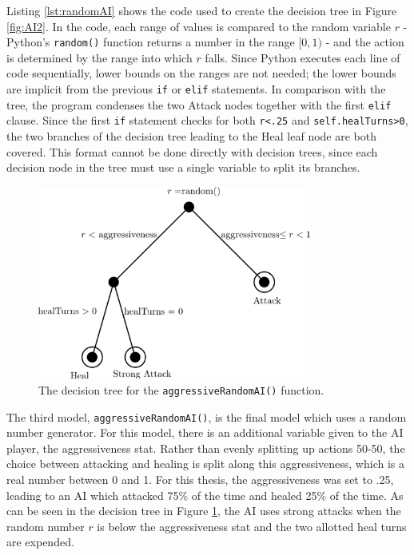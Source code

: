 Listing \ref{lst:randomAI} shows the code used to create the decision tree in Figure \ref{fig:AI2}. In the code, each range of values is compared to the random variable $r$ - Python's \texttt{random()} function returns a number in the range $[0, 1)$ - and the action is determined by the range into which $r$ falls. Since Python executes each line of code sequentially, lower bounds on the ranges are not needed; the lower bounds are implicit from the previous \texttt{if} or \texttt{elif} statements. In comparison with the tree, the program condenses the two Attack nodes together with the first \texttt{elif} clause. Since the first \texttt{if} statement checks for both \texttt{r<.25} and \texttt{self.healTurns>0}, the two branches of the decision tree leading to the Heal leaf node are both covered. This format cannot be done directly with decision trees, since each decision node in the tree must use a single variable to split its branches.

\begin{figure}[H]
  \centering
  \includegraphics[width=9cm]{figures/AIAgressive.png}
  \caption{The decision tree for the \texttt{aggressiveRandomAI()} function.}
  \label{fig:AI3}
\end{figure}

The third model, \texttt{aggressiveRandomAI()}, is the final model which uses a random number generator. For this model, there is an additional variable given to the AI player, the aggressiveness stat. Rather than evenly splitting up actions 50-50, the choice between attacking and healing is split along this aggressiveness, which is a real number between 0 and 1. For this thesis, the aggressiveness was set to .25, leading to an AI which attacked 75\% of the time and healed 25\% of the time. As can be seen in the decision tree in Figure \ref{fig:AI3}, the AI uses strong attacks when the random number $r$ is below the aggressiveness stat and the two allotted heal turns are expended.

